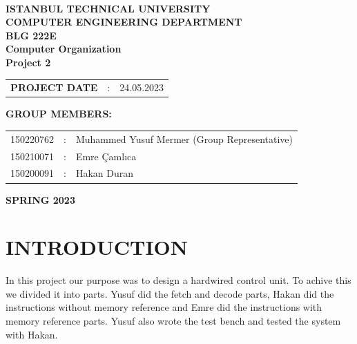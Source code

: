 \documentclass[pdftex,12pt,a4paper]{article}
\begin{document}
\begin{titlepage}
\begin{center}
\textbf{}\\
\textbf{\Large{ISTANBUL TECHNICAL UNIVERSITY}}\\
\vspace{0.5cm}
\textbf{\Large{COMPUTER ENGINEERING DEPARTMENT}}\\
\vspace{2cm}
\textbf{\Large{BLG 222E\\ Computer Organization \\ Project 2}}\\
\vspace{2.8cm}
\begin{table}[ht]
\centering
\Large{
\begin{tabular}{lcl}
\textbf{PROJECT DATE}  & : & 24.05.2023\\
\end{tabular}}
\end{table}
\vspace{1cm}
\textbf{\Large{GROUP MEMBERS:}}\\
\begin{table}[ht]
\centering
\Large{
\begin{tabular}{rcl}
150220762  & : & Muhammed Yusuf Mermer (Group Representative)  \\
150210071  & : & Emre Çamlıca \\
150200091  & : & Hakan Duran \\
\end{tabular}}
\end{table}
\vspace{2.8cm}
\textbf{\Large{SPRING 2023}}

\end{center}

\end{titlepage}

\thispagestyle{empty}
\setcounter{tocdepth}{4}
\tableofcontents
\clearpage

\setcounter{page}{1}
\section{INTRODUCTION}
In this project our purpose was to design a hardwired control unit. To achive this we divided it into parts. Yusuf did 
the fetch and decode parts, Hakan did the instructions without memory reference and Emre did the instructions with 
memory reference parts. Yusuf also wrote the test bench and tested the system with Hakan. 
\end{document}
